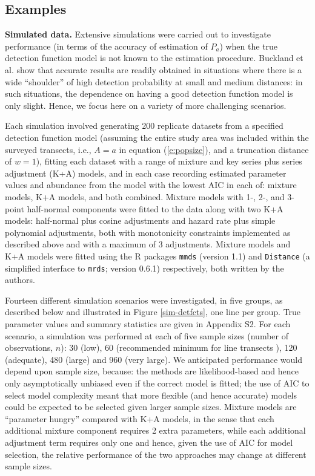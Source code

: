 \documentclass[10pt]{article}
\begin{document}
\subsection*{Examples}

\textbf{Simulated data.} Extensive simulations were carried out to investigate performance (in terms of the accuracy of estimation of $P_a$) when the true detection function model is not known to the estimation procedure. 
 Buckland et al. \cite{Buckland:2001vm} show that accurate results are readily obtained in situations where there is a wide ``shoulder'' of high detection probability at small and medium distances: in such situations, the dependence on having a good detection function model is only slight.  Hence, we focus here on a variety of more challenging scenarios.

Each simulation involved generating 200 replicate datasets from a specified detection function model (assuming the entire study area was included within the surveyed transects, i.e., $A=a$ in equation (\ref{e:popsize}), and a truncation distance of $w=1$), fitting each dataset with a range of mixture and key series plus series adjustment (K+A) models, and in each case recording estimated parameter values and abundance from the model with the lowest AIC in each of: mixture models, K+A models, and both combined.  Mixture models with 1-, 2-, and 3-point half-normal components were fitted to the data along with two K+A models: half-normal plus cosine adjustments and hazard rate plus simple polynomial adjustments, both with monotonicity constraints implemented as described above and with a maximum of 3 adjustments. Mixture models and K+A models were fitted using the R packages \texttt{mmds} (version 1.1) and \texttt{Distance} (a simplified interface to \texttt{mrds}; version 0.6.1) respectively, both written by the authors.

Fourteen different simulation scenarios were investigated, in five groups, as described below and illustrated in Figure \ref{sim-detfcts}, one line per group. True parameter values and summary statistics are given in Appendix S2.  For each scenario, a simulation was performed at each of five sample sizes (number of observations, $n$): 30 (low), 60 (recommended minimum for line transects \cite{Buckland:2001vm}), 120 (adequate), 480 (large) and 960 (very large).  We anticipated performance would depend upon sample size, because: the methods are likelihood-based and hence only asymptotically unbiased even if the correct model is fitted; the use of AIC to select model complexity meant that more flexible (and hence accurate) models could be expected to be selected given larger sample sizes. Mixture models are ``parameter hungry'' compared with K+A models, in the sense that each additional mixture component requires 2 extra parameters, while each additional adjustment term requires only one and hence, given the use of AIC for model selection, the relative performance of the two approaches may change at different sample sizes. 
\end{document}
